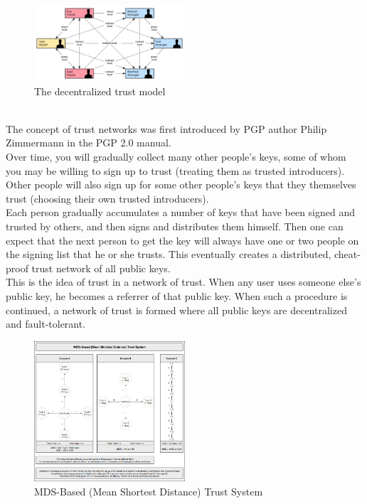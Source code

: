 \begin{figure}[H] %
    \centering %
    \includegraphics[width=0.5\textwidth]{figures/decentralized_trust_model.png} %
    \caption{The decentralized trust model} %
    \label{Fig.2: decentralized_trust_model} %
    \end{figure}
\\
The concept of trust networks was first introduced by PGP author Philip Zimmermann in 
the PGP 2.0 manual\cite{b7}.
\\
Over time, you will gradually collect many other people's keys, some of whom you may 
be willing to sign up to trust (treating them as trusted introducers). Other people 
will also sign up for some other people's keys that they themselves trust (choosing 
their own trusted introducers).
\\
Each person gradually accumulates a number of keys that have been signed and trusted 
by others, and then signs and distributes them himself. Then one can expect that the 
next person to get the key will always have one or two people on the signing list that 
he or she trusts. This eventually creates a distributed, cheat-proof trust network of 
all public keys.
\\
This is the idea of trust in a network of trust. When any user uses someone else's 
public key, he becomes a referrer of that public key. When such a procedure is 
continued, a network of trust is formed where all public keys are decentralized 
and fault-tolerant.

\begin{figure}[H] %
    \centering %
    \includegraphics[width=0.5\textwidth]{figures/trustSystem.png} %
    \caption{MDS-Based (Mean Shortest Distance) Trust System} %
    \label{Fig.2: MDS-Based (Mean Shortest Distance) Trust System} %
    \end{figure}

